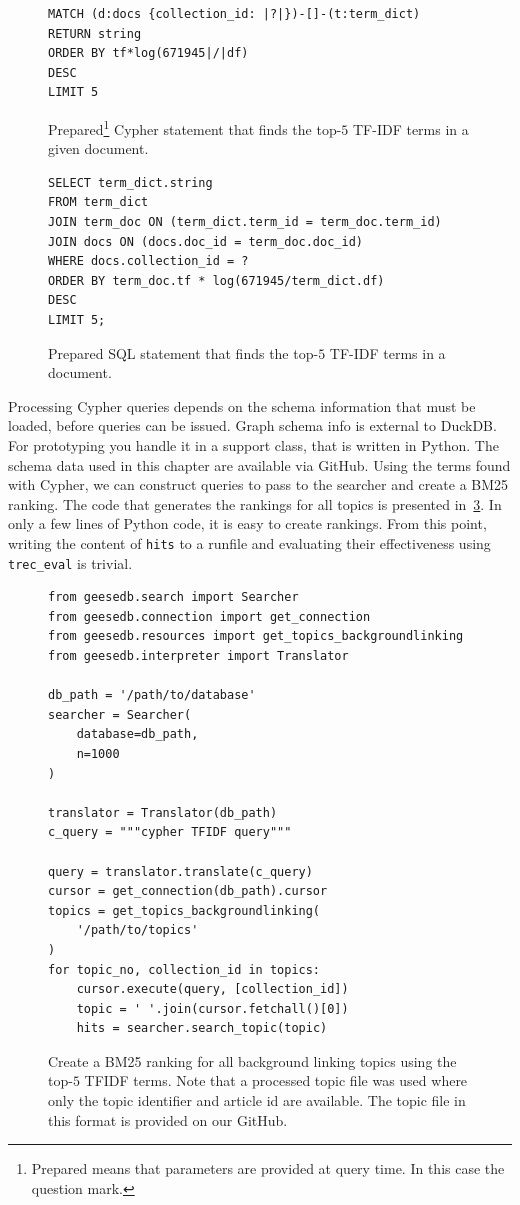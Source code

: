 \begin{figure}
	\begin{verbatim}
MATCH (d:docs {collection_id: |?|})-[]-(t:term_dict)
RETURN string
ORDER BY tf*log(671945|/|df)
DESC
LIMIT 5
	\end{verbatim}
	\caption{Prepared\footnote{Prepared means that parameters are provided at query time. In this case the question mark.} Cypher statement that finds the top-$5$ TF-IDF terms in a given document.}
	\label{fig:tfidf-cypher}
\end{figure}
\begin{figure}
	\begin{verbatim}
SELECT term_dict.string
FROM term_dict
JOIN term_doc ON (term_dict.term_id = term_doc.term_id)
JOIN docs ON (docs.doc_id = term_doc.doc_id)
WHERE docs.collection_id = ?
ORDER BY term_doc.tf * log(671945/term_dict.df)
DESC
LIMIT 5;
	\end{verbatim}
	\caption{Prepared SQL statement that finds the top-$5$ TF-IDF terms in a document.}
	\label{fig:tfidf}
\end{figure}
Processing Cypher queries depends on the schema information that must be loaded, before queries can be issued. Graph schema info is external to DuckDB. For prototyping you handle it in a support class, that is written in Python. The schema data used in this chapter are available via GitHub. Using the terms found with Cypher, we can construct queries to pass to the searcher and create a BM25 ranking. The code that generates the rankings for all topics is presented in~\cref{fig:code_bm25_background_linking}. In only a few lines of Python code, it is easy to create rankings. From this point, writing the content of \texttt{hits} to a runfile and evaluating their effectiveness using \texttt{trec\_eval} is trivial. 

\begin{figure}
	\begin{verbatim}
from geesedb.search import Searcher
from geesedb.connection import get_connection
from geesedb.resources import get_topics_backgroundlinking
from geesedb.interpreter import Translator

db_path = '/path/to/database'
searcher = Searcher(
    database=db_path, 
    n=1000
)

translator = Translator(db_path)
c_query = """cypher TFIDF query"""

query = translator.translate(c_query)
cursor = get_connection(db_path).cursor
topics = get_topics_backgroundlinking(
    '/path/to/topics'
)
for topic_no, collection_id in topics:
    cursor.execute(query, [collection_id])
    topic = ' '.join(cursor.fetchall()[0])
    hits = searcher.search_topic(topic)
	\end{verbatim}
	\caption{Create a BM25 ranking for all background linking topics using the top-$5$ TFIDF terms. Note that a processed topic file was used where only the topic identifier and article id are available. The topic file in this format is provided on our GitHub.}
	\label{fig:code_bm25_background_linking}
\end{figure}

